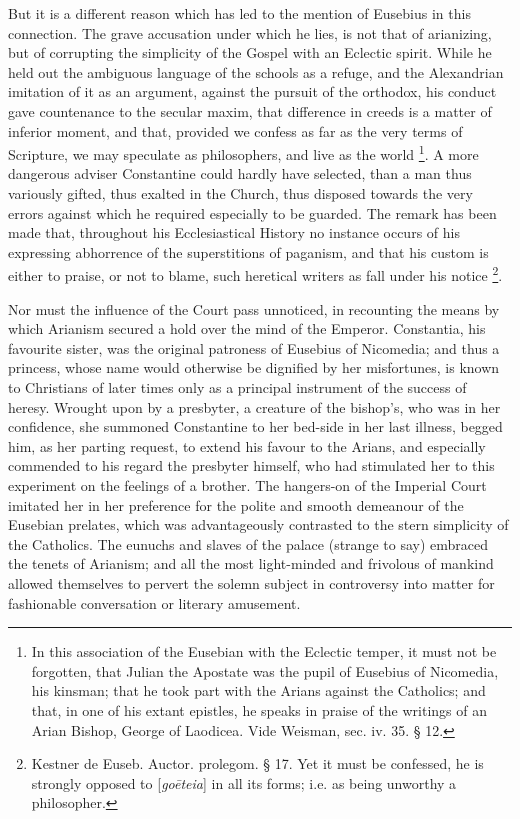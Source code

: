 But it is a different reason which has led to the mention of
Eusebius in this connection. The grave accusation under which he lies,
is not that of arianizing, but of corrupting the simplicity of
the Gospel with an Eclectic spirit. While he held out the ambiguous
language of the schools as a refuge, and the Alexandrian imitation of
it as an argument, against the pursuit of the orthodox, his conduct
gave countenance to the secular maxim, that difference in creeds is a
matter of inferior moment, and that, provided we confess as far as the
very terms of Scripture, we may speculate as philosophers, and live as
the world \footnote{In this association of the Eusebian with the
Eclectic temper, it must not be forgotten, that Julian the Apostate
was the pupil of Eusebius of Nicomedia, his kinsman; that he took part
with the Arians against the Catholics; and that, in one of his extant
epistles, he speaks in praise of the writings of an Arian Bishop,
George of Laodicea. Vide Weisman, sec. iv. 35. § 12.}. A more
dangerous adviser Constantine could hardly have selected, than a man
thus variously gifted, thus exalted in the Church, thus disposed
towards the very errors against which he required especially to be
guarded. The remark has been made that, throughout his Ecclesiastical
History no instance occurs of his expressing abhorrence of the
superstitions of paganism, and that his custom is either to praise, or
not to blame, such heretical writers as fall under his notice \footnote{Kestner de Euseb. Auctor. prolegom. § 17.
Yet it must be confessed, he is strongly opposed to [\emph{go\={e}teia}]
in all its forms; i.e. as being unworthy a philosopher.}.

Nor must the influence of the Court pass unnoticed, in recounting
the means by which Arianism secured a hold over the mind of the
Emperor. Constantia, his favourite sister, was the original patroness
of Eusebius of Nicomedia; and thus a princess, whose name would
otherwise be dignified by her misfortunes, is known to
Christians of later times only as a principal instrument of the
success of heresy. Wrought upon by a presbyter, a creature of the
bishop's, who was in her confidence, she summoned Constantine to her
bed-side in her last illness, begged him, as her parting request, to
extend his favour to the Arians, and especially commended to his
regard the presbyter himself, who had stimulated her to this
experiment on the feelings of a brother. The hangers-on of the
Imperial Court imitated her in her preference for the polite and
smooth demeanour of the Eusebian prelates, which was advantageously
contrasted to the stern simplicity of the Catholics. The eunuchs and
slaves of the palace (strange to say) embraced the tenets of Arianism;
and all the most light-minded and frivolous of mankind allowed
themselves to pervert the solemn subject in controversy into matter
for fashionable conversation or literary amusement.

